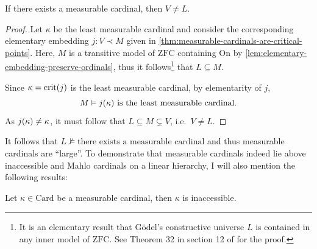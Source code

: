 \documentclass[12pt]{article}
\theoremstyle{plain}
\theoremstyle{definition}
\newcommand{\ZFC}{\mathrm{ZFC}}
\newcommand{\On}{\mathrm{On}}
\newcommand{\Card}{\mathrm{Card}}
\DeclareMathOperator{\crit}{crit}
\begin{document}
\begin{corollary}
	If there exists a measurable cardinal, then $V \neq L$.
\end{corollary}

\begin{proof}
	Let $\kappa$ be the least measurable cardinal and consider the corresponding elementary embedding $j : V \prec M$ given in \autoref{thm:measurable-cardinals-are-critical-points}. Here, $M$ is a transitive model of $\ZFC$ containing $\On$ by \autoref{lem:elementary-embedding-preserve-ordinals}, thus it follows\footnote{It is an elementary result that G\"odel's constructive universe $L$ is contained in any inner model of $\ZFC$. See Theorem 32 in section 12 of \cite{jech-set-theory} for the proof.} that $L \subseteq M$.

	Since $\kappa = \crit\mleft(j\mright)$ is the least measurable cardinal, by elementarity of $j$,
	\[M \vDash \text{$j\mleft(\kappa\mright)$ is the least measurable cardinal}.\]
	As $j\mleft(\kappa\mright) \neq \kappa$, it must follow that $L \subseteq M \subsetneq V$, i.e.\ $V \neq L$.
\end{proof}

It follows that $L \not\vDash \text{there exists a measurable cardinal}$ and thus measurable cardinals are ``large''. To demonstrate that measurable cardinals indeed lie above inaccessible and Mahlo cardinals on a linear hierarchy, I will also mention the following results:

\begin{proposition}
	\label{prop:measurable-is-inaccessible}
	Let $\kappa \in \Card$ be a measurable cardinal, then $\kappa$ is inaccessible.
\end{proposition}
\end{document}
